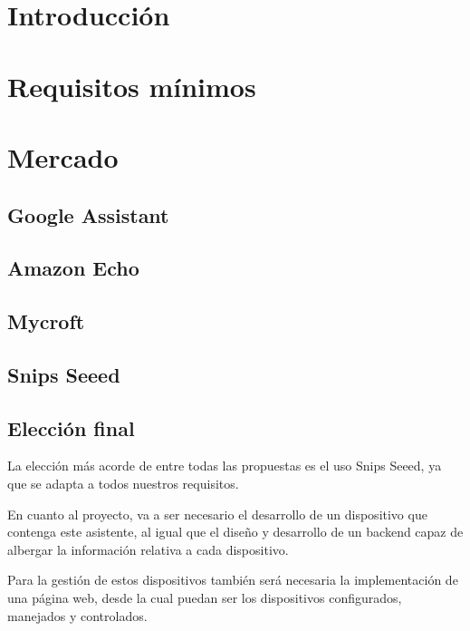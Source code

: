 \section{Introducción}


\section{Requisitos mínimos}


\section{Mercado}


    \subsection{Google Assistant}
    
    
    \subsection{Amazon Echo}
    
    
    \subsection{Mycroft}
    
    
    \subsection{Snips Seeed}
    
    
    \subsection{Elección final}

La elección más acorde de entre todas las propuestas es el uso Snips Seeed, ya que se adapta a todos nuestros requisitos.

En cuanto al proyecto, va a ser necesario el desarrollo de un dispositivo que contenga este asistente, al igual que el diseño y desarrollo de un backend capaz de albergar la información relativa a cada dispositivo.

Para la gestión de estos dispositivos también será necesaria la implementación de una página web, desde la cual puedan ser los dispositivos configurados, manejados y controlados.

